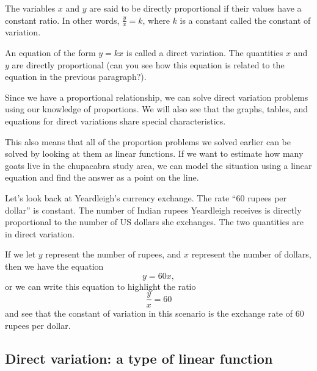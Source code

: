 \begin{boxdef}
The variables $x$ and $y$ are said to be \gls{directly proportional} if their values have a constant ratio. In other words, $\frac{y}{x} = k$, where $k$ is a constant called the \gls{constant of variation}.

An equation of the form $y = kx$ is called a \gls{direct variation}. The quantities $x$ and $y$ are directly proportional (can you see how this equation is related to the equation in the previous paragraph?).
\end{boxdef}

Since we have a proportional relationship, we can solve direct variation problems using our knowledge of proportions. We will also see that the graphs, tables, and equations for direct variations share special characteristics.

This also means that all of the proportion problems we solved earlier can be solved by looking at them as linear functions. If we want to estimate how many goats live in the chupacabra study area, we can model the situation using a linear equation and find the answer as a point on the line.

Let's look back at Yeardleigh's currency exchange. The rate ``60 rupees per dollar'' is constant. The number of Indian rupees Yeardleigh receives is directly proportional to the number of US dollars she exchanges. The two quantities are in direct variation.

If we let $y$ represent the number of rupees, and $x$ represent the number of dollars, then we have the equation \[y = 60x,\] or we can write this equation to highlight the ratio \[\frac{y}{x} = 60\] and see that the constant of variation in this scenario is the exchange rate of 60 rupees per dollar.

%

\subsection{Direct variation: a type of linear function}


